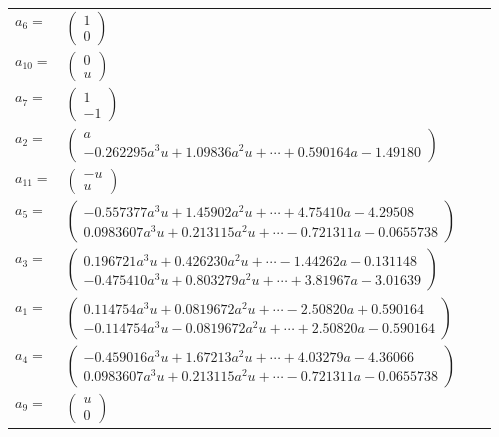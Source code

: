 \documentclass[1p]{elsarticle_modified}
\theoremstyle{definition}
\begin{document}
\begin{tabular}{m{7pt} m{180pt} m{7pt} m{180pt} }
\flushright $a_{6}=$&$\begin{pmatrix}1\\0\end{pmatrix}$ \\
\flushright $a_{10}=$&$\begin{pmatrix}0\\u\end{pmatrix}$ \\
\flushright $a_{7}=$&$\begin{pmatrix}1\\-1\end{pmatrix}$ \\
\flushright $a_{2}=$&$\begin{pmatrix}a\\-0.262295 a^{3} u+1.09836 a^{2} u+\cdots+0.590164 a-1.49180\end{pmatrix}$ \\
\flushright $a_{11}=$&$\begin{pmatrix}- u\\u\end{pmatrix}$ \\
\flushright $a_{5}=$&$\begin{pmatrix}-0.557377 a^{3} u+1.45902 a^{2} u+\cdots+4.75410 a-4.29508\\0.0983607 a^{3} u+0.213115 a^{2} u+\cdots-0.721311 a-0.0655738\end{pmatrix}$ \\
\flushright $a_{3}=$&$\begin{pmatrix}0.196721 a^{3} u+0.426230 a^{2} u+\cdots-1.44262 a-0.131148\\-0.475410 a^{3} u+0.803279 a^{2} u+\cdots+3.81967 a-3.01639\end{pmatrix}$ \\
\flushright $a_{1}=$&$\begin{pmatrix}0.114754 a^{3} u+0.0819672 a^{2} u+\cdots-2.50820 a+0.590164\\-0.114754 a^{3} u-0.0819672 a^{2} u+\cdots+2.50820 a-0.590164\end{pmatrix}$ \\
\flushright $a_{4}=$&$\begin{pmatrix}-0.459016 a^{3} u+1.67213 a^{2} u+\cdots+4.03279 a-4.36066\\0.0983607 a^{3} u+0.213115 a^{2} u+\cdots-0.721311 a-0.0655738\end{pmatrix}$ \\
\flushright $a_{9}=$&$\begin{pmatrix}u\\0\end{pmatrix}$ \\

\end{tabular}
\end{document}
